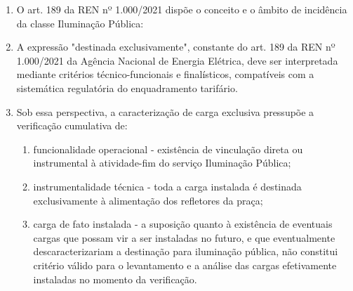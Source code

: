 \begin{enumerate}[resume]

    \item O art. 189 da REN nº 1.000/2021 dispõe o conceito e o âmbito de incidência da classe Iluminação Pública:


    \item A expressão "destinada exclusivamente", constante do art. 189 da REN nº 1.000/2021 da Agência Nacional de Energia Elétrica, deve ser interpretada mediante critérios técnico-funcionais e finalísticos, compatíveis com a sistemática regulatória do enquadramento tarifário.

    \item Sob essa perspectiva, a caracterização de carga exclusiva pressupõe a verificação cumulativa de:

    \begin{enumerate}
        \item funcionalidade operacional - existência de vinculação direta ou instrumental à atividade-fim do serviço Iluminação Pública;

        \item instrumentalidade técnica - toda a carga instalada é destinada exclusivamente à alimentação dos refletores da praça;

        \item carga de fato instalada - a suposição quanto à existência de eventuais cargas que possam vir a ser instaladas no futuro, e que eventualmente descaracterizariam a destinação para iluminação pública, não constitui critério válido para o levantamento e a análise das cargas efetivamente instaladas no momento da verificação.
    \end{enumerate}


\end{enumerate}
